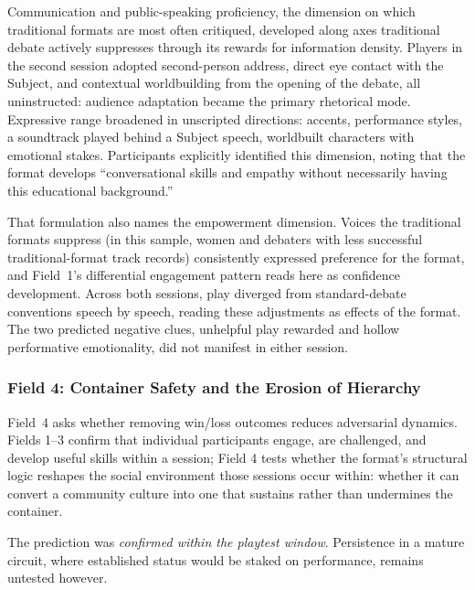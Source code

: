 Communication and public-speaking proficiency, the dimension on which traditional formats are most often critiqued, developed along axes traditional debate actively suppresses through its rewards for information density. Players in the second session adopted second-person address, direct eye contact with the Subject, and contextual worldbuilding from the opening of the debate, all uninstructed: audience adaptation became the primary rhetorical mode. Expressive range broadened in unscripted directions: accents, performance styles, a soundtrack played behind a Subject speech, worldbuilt characters with emotional stakes. Participants explicitly identified this dimension, noting that the format develops ``conversational skills and empathy without necessarily having this educational background.''

That formulation also names the empowerment dimension. Voices the traditional formats suppress (in this sample, women and debaters with less successful traditional-format track records) consistently expressed preference for the format, and Field~1's differential engagement pattern reads here as confidence development. Across both sessions, play diverged from standard-debate conventions speech by speech, reading these adjustments as effects of the format. The two predicted negative clues, unhelpful play rewarded and hollow performative emotionality, did not manifest in either session.

\subsubsection{Field 4: Container Safety and the Erosion of Hierarchy}

Field~4 asks whether removing win/loss outcomes reduces adversarial dynamics.  Fields 1--3 confirm that individual participants engage, are challenged, and develop useful skills within a session; Field 4 tests whether the format's structural logic reshapes the social environment those sessions occur within: whether it can convert a community culture into one that sustains rather than undermines the container. 

The prediction was \textit{confirmed within the playtest window}. Persistence in a mature circuit, where established status would be staked on performance, remains untested however.

